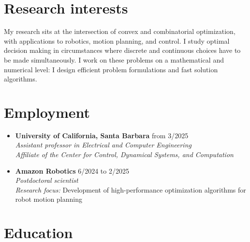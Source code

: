 \documentclass[11pt,a4paper,sans]{moderncv}
\begin{document}
\makecvtitle

\section{Research interests}

\small{
My research sits at the intersection of convex and combinatorial optimization, with applications to robotics, motion planning, and control.
I study optimal decision making in circumstances where discrete and continuous choices have to be made simultaneously.
I work on these problems on a mathematical and numerical level: I design efficient problem formulations and fast solution algorithms.
}

\section{Employment}

\vspace{5pt}

\begin{itemize}


\item \textbf{University of California, Santa Barbara} \hfill from 3/2025 \\
\textit{Assistant professor in Electrical and Computer Engineering} \\
\textit{Affiliate of the Center for Control, Dynamical Systems, and Computation}

\item \textbf{Amazon Robotics} \hfill 6/2024 to 2/2025 \\
\textit{Postdoctoral scientist} \\
\textit{Research focus:} Development of high-performance optimization algorithms for robot motion planning

\end{itemize}

\section{Education}
\end{document}
